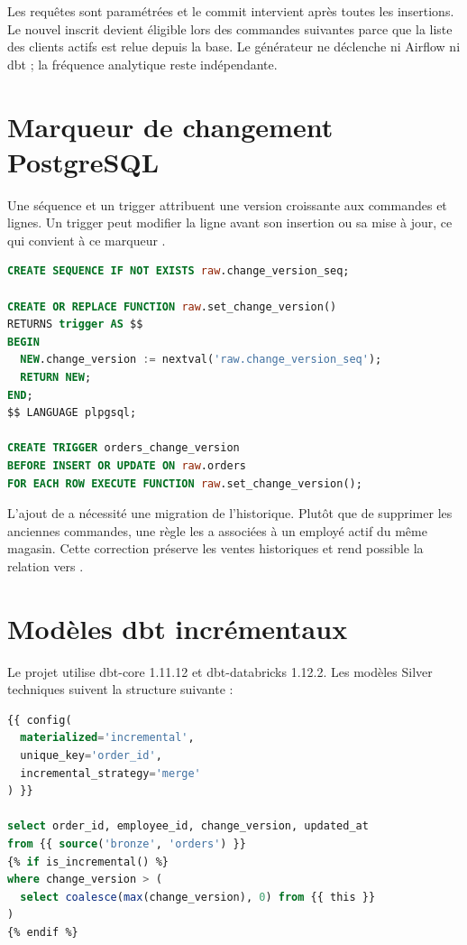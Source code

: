 Les requêtes sont paramétrées et le commit intervient après toutes les insertions. Le nouvel inscrit devient éligible lors des commandes suivantes parce que la liste des clients actifs est relue depuis la base. Le générateur ne déclenche ni Airflow ni dbt ; la fréquence analytique reste indépendante.

\section{Marqueur de changement PostgreSQL}
Une séquence et un trigger attribuent une version croissante aux commandes et lignes. Un trigger  peut modifier la ligne avant son insertion ou sa mise à jour, ce qui convient à ce marqueur \cite{postgres-triggers}.

\begin{lstlisting}[language=SQL,caption={Principe de change\_version}]
CREATE SEQUENCE IF NOT EXISTS raw.change_version_seq;

CREATE OR REPLACE FUNCTION raw.set_change_version()
RETURNS trigger AS $$
BEGIN
  NEW.change_version := nextval('raw.change_version_seq');
  RETURN NEW;
END;
$$ LANGUAGE plpgsql;

CREATE TRIGGER orders_change_version
BEFORE INSERT OR UPDATE ON raw.orders
FOR EACH ROW EXECUTE FUNCTION raw.set_change_version();
\end{lstlisting}

L'ajout de  a nécessité une migration de l'historique. Plutôt que de supprimer les anciennes commandes, une règle les a associées à un employé actif du même magasin. Cette correction préserve les ventes historiques et rend possible la relation  vers .

\section{Modèles dbt incrémentaux}
Le projet utilise dbt-core 1.11.12 et dbt-databricks 1.12.2. Les modèles Silver techniques suivent la structure suivante :

\begin{lstlisting}[language=SQL,caption={Structure conceptuelle d'un modèle Silver}]
{{ config(
  materialized='incremental',
  unique_key='order_id',
  incremental_strategy='merge'
) }}

select order_id, employee_id, change_version, updated_at
from {{ source('bronze', 'orders') }}
{% if is_incremental() %}
where change_version > (
  select coalesce(max(change_version), 0) from {{ this }}
)
{% endif %}
\end{lstlisting}

